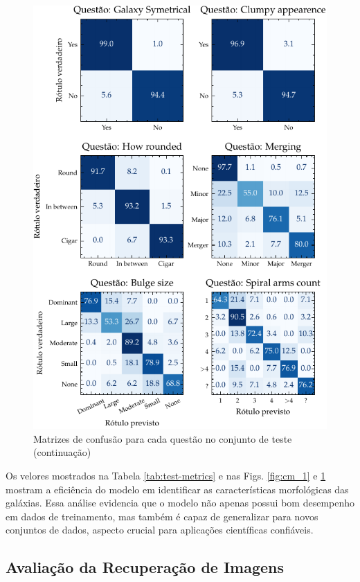 \begin{figure}[!ht]
  \centering
  \includegraphics[width=\linewidth]{notebooks/plots/cm_2.pdf}
  \caption{Matrizes de confusão para cada questão no conjunto de teste (continuação)}
  \label{fig:cm_2}
\end{figure}


Os velores mostrados na Tabela \ref{tab:test-metrics} e nas Figs. \ref{fig:cm_1} e \ref{fig:cm_2} mostram a eficiência do modelo em identificar as características morfológicas das galáxias. Essa análise evidencia que o modelo não apenas possui bom desempenho em dados de treinamento, mas também é capaz de generalizar para novos conjuntos de dados, aspecto crucial para aplicações científicas confiáveis.




\subsection{Avaliação da Recuperação de Imagens}
\label{sec:res-ret}

